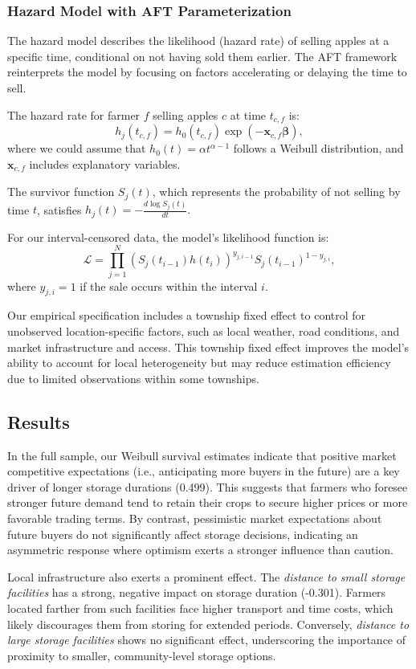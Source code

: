 \documentclass[12pt]{article}
\begin{document}
\subsubsection{Hazard Model with AFT Parameterization}
The hazard model describes the likelihood (hazard rate) of selling apples at a specific time, conditional on not having sold them earlier. The AFT framework reinterprets the model by focusing on factors accelerating or delaying the time to sell.

The hazard rate for farmer $f$ selling apples $c$ at time $t_{c,f}$ is:
$$
    h_j(t_{c,f}) = h_0(t_{c,f}) \exp\left(-\mathbf{x}_{c,f} \boldsymbol{\beta}\right),
$$
where we could assume that $h_0(t) = \alpha t^{\alpha-1}$ follows a Weibull distribution, and $\mathbf{x}_{c,f}$ includes explanatory variables.

The survivor function $S_j(t)$, which represents the probability of not selling by time $t$, satisfies $h_j(t) = -\frac{d \log S_j(t)}{dt}. $

For our interval-censored data, the model's likelihood function is:
$$
    \mathcal{L} = \prod_{j=1}^N \left(S_j(t_{i-1}) h(t_i)\right)^{y_{j,i-1}} S_j(t_{i-1})^{1-y_{j,i}},
$$
where $y_{j,i} = 1$ if the sale occurs within the interval $i$.

Our empirical specification includes a township fixed effect to control for unobserved location-specific factors, such as local weather, road conditions, and market infrastructure and access. This township fixed effect improves the model’s ability to account for local heterogeneity but may reduce estimation efficiency due to limited observations within some townships.


\subsection{Results}


In the full sample, our Weibull survival estimates indicate that positive market competitive expectations (i.e., anticipating more buyers in the future) are a key driver of longer storage durations (0.499). This suggests that farmers who foresee stronger future demand tend to retain their crops to secure higher prices or more favorable trading terms. By contrast, pessimistic market expectations about future buyers do not significantly affect storage decisions, indicating an asymmetric response where optimism exerts a stronger influence than caution.

Local infrastructure also exerts a prominent effect. The \textit{distance to small storage facilities} has a strong, negative impact on storage duration (-0.301). Farmers located farther from such facilities face higher transport and time costs, which likely discourages them from storing for extended periods. Conversely, \textit{distance to large storage facilities} shows no significant effect, underscoring the importance of proximity to smaller, community-level storage options.
\end{document}
